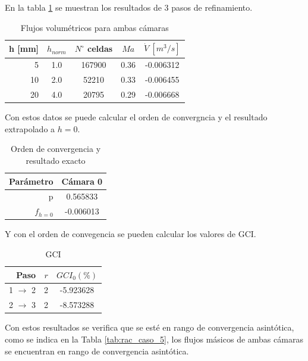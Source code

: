 \documentclass[11pt]{article}
\begin{document}
En la tabla \ref{tab:res_caso5} se muestran los resultados de 3 pasos de
refinamiento.

\begin{table}[h]
    \centering
    \begin{tabular}{rcccc}\toprule
        h [mm] & $h_{norm}$ & $N^{\circ}$ celdas & $Ma$ & $\dot{V}\ [m^3/s]$ \\ \midrule
        5      & 1.0        & 167900             & 0.36 & -0.006312 \\
        10     & 2.0        & 52210              & 0.33 & -0.006455 \\
        20     & 4.0        & 20795              & 0.29 & -0.006668 \\ \bottomrule
    \end{tabular}
    \caption{Flujos volumétricos para ambas cámaras}
    \label{tab:res_caso5}
\end{table}

Con estos datos se puede calcular el orden de convergncia y el resultado
extrapolado a $h=0$.

\begin{table}[h]
    \centering
    \begin{tabular}{rc}\toprule
        Parámetro & Cámara 0  \\ \midrule
        p         &  0.565833 \\
        $f_{h=0}$ & -0.006013 \\ \bottomrule
    \end{tabular}
    \caption{Orden de convergencia y resultado exacto}
    \label{tab:res1_caso5}
\end{table}

Y con el orden de convegencia se pueden calcular los valores de GCI.

\begin{table}
    \centering
    \begin{tabular}{rcc}\toprule
        Paso              & $r$ & $GCI_0(\%)$ \\ \midrule
        1 $\rightarrow$ 2 & 2   & -5.923628   \\
        2 $\rightarrow$ 3 & 2   & -8.573288   \\ \bottomrule
    \end{tabular}
    \caption{GCI}
    \label{tab:gci_caso_5}
\end{table}

Con estos resultados se verifica que se esté en rango de convergencia
asintótica, como se indica en la Tabla \ref{tab:rac_caso_5}, los flujos
másicos de ambas cámaras se encuentran en rango de convergencia asintótica.
\end{document}
